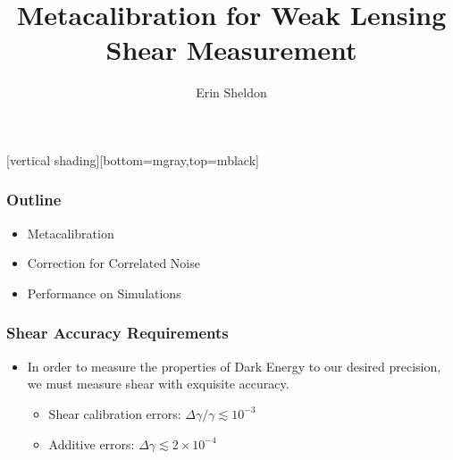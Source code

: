 \documentclass{beamer}
\title{Metacalibration for Weak Lensing Shear Measurement}
\author{Erin Sheldon}
\institute{Brookhaven National Laboratory\\LSST DESC Meeting at SLAC}
\begin{document}
\frame{\titlepage}


[vertical shading][bottom=mgray,top=mblack]

\frame
{
    \frametitle{Outline}

 
    \begin{itemize}

        \item Metacalibration

        \item Correction for Correlated Noise

        \item Performance on Simulations

    \end{itemize}

}

\frame
{
    \frametitle{Shear Accuracy Requirements}

 
    \begin{itemize}

        \item In order to measure the properties of Dark Energy to our desired
            precision, we must measure shear with exquisite accuracy.

            \begin{itemize}
                \item Shear calibration errors: {\color{brightred} $\Delta \gamma/\gamma \lesssim 10^{-3}$}
                \item Additive errors: {\color{brightred} $\Delta \gamma \lesssim 2 \times 10^{-4}$}
            \end{itemize}
    \end{itemize}

}
\end{document}
